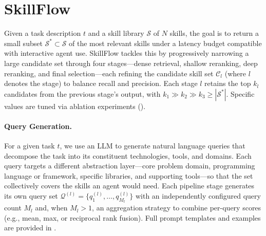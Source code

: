 \documentclass[11pt]{article}
\begin{document}
\section{SkillFlow}
\label{sec:method}

Given a task description $t$ and a skill library $\mathcal{S}$ of $N$ skills, the goal is to return a small subset $\mathcal{S}^* \subset \mathcal{S}$ of the most relevant skills under a latency budget compatible with interactive agent use.
SkillFlow tackles this by progressively narrowing a large candidate set through four stages---dense retrieval, shallow reranking, deep reranking, and final selection---each refining the candidate skill set $\mathcal{C}_l$ (where $l$ denotes the stage) to balance recall and precision.
Each stage $l$ retains the top $k_l$ candidates from the previous stage's output, with $k_1 \gg k_2 \gg k_3 \geq |\mathcal{S}^*|$. Specific values are tuned via ablation experiments ().

\paragraph{Query Generation.}
For a given task $t$, we use an LLM to generate natural language queries that decompose the task into its constituent technologies, tools, and domains.
Each query targets a different abstraction layer---core problem domain, programming language or framework, specific libraries, and supporting tools---so that the set collectively covers the skills an agent would need.
Each pipeline stage generates its own query set $\mathcal{Q}^{(l)} = \{q^{(l)}_1, \ldots, q^{(l)}_{M_l}\}$ with an independently configured query count $M_l$ and, when $M_l > 1$, an aggregation strategy to combine per-query scores (e.g., mean, max, or reciprocal rank fusion).
Full prompt templates and examples are provided in .
\end{document}
